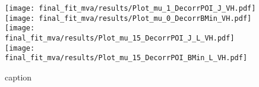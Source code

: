 \begin{figure}[!htbp]
	\centering
	\texttt{[image: final\_fit\_mva/results/Plot\_mu\_1\_DecorrPOI\_J\_VH.pdf]}
	\texttt{[image: final\_fit\_mva/results/Plot\_mu\_0\_DecorrBMin\_VH.pdf]}
	\texttt{[image: final\_fit\_mva/results/Plot\_mu\_15\_DecorrPOI\_J\_L\_VH.pdf]}
	\texttt{[image: final\_fit\_mva/results/Plot\_mu\_15\_DecorrPOI\_BMin\_L\_VH.pdf]}
  \caption{caption}
\label{fig:channels-mus-uncorr}
\end{figure}